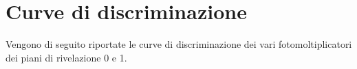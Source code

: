 \appendix
\chapter{Curve di discriminazione}                          %
Vengono di seguito riportate le curve di discriminazione dei vari fotomoltiplicatori dei piani di rivelazione 0 e 1.

\begin{figure}[H]
	\centering
		\begin{minipage}{.5\textwidth}
			\centering
			\quad
		\end{minipage}%
		\begin{minipage}{.5\textwidth}
			\centering
			\quad
		\end{minipage}
	\begin{minipage}{.5\textwidth}
		\centering
		\quad

\end{minipage}
\end{figure}
